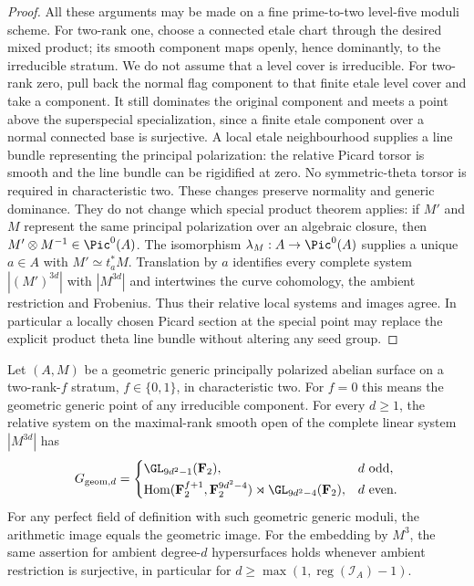 \begin{proof}
All these arguments may be made on a fine prime-to-two
level-five moduli scheme. For two-rank one, choose a
connected etale chart through the desired mixed product;
its smooth component maps openly, hence dominantly, to
the irreducible stratum. We do not assume that a level
cover is irreducible. For two-rank zero, pull back the
normal flag component to that finite etale level cover
and take a component. It still dominates the original
component and meets a point above the superspecial
specialization, since a finite etale component over a
normal connected base is surjective. A local etale
neighbourhood supplies a line bundle representing the
principal polarization: the relative Picard torsor is
smooth and the line bundle can be rigidified at zero.
No symmetric-theta torsor is required in characteristic two.
These changes preserve normality and generic dominance.
They do not change which special product theorem applies:
if $M'$ and $M$ represent the same principal polarization
over an algebraic closure, then $M'\otimes M^{-1}\in\Pic^0(A)$.
The isomorphism $\lambda_M:A\to\Pic^0(A)$ supplies a unique
$a\in A$ with $M'\simeq t_a^*M$. Translation by $a$
identifies every complete system $|(M')^{3d}|$ with
$|M^{3d}|$ and intertwines the curve cohomology, the ambient
restriction and Frobenius. Thus their relative local systems
and images agree. In particular a locally chosen Picard
section at the special point may replace the explicit
product theta line bundle without altering any seed group.
\end{proof}

\begin{theorem}
\label{thm:generic-nonordinary-ppav-groups-candidate}
Let $(A,M)$ be a geometric generic principally polarized
abelian surface on a two-rank-$f$ stratum, $f\in\{0,1\}$,
in characteristic two. For $f=0$ this means the geometric
generic point of any irreducible component.
For every $d\ge1$, the relative system on the maximal-rank
smooth open of the complete linear system $|M^{3d}|$ has
\[
 G_{\mathrm{geom},d}=
 \begin{cases}
 \GL_{9d^2-1}(\mathbf F_2),&d\text{ odd},\\[2pt]
 \operatorname{Hom}(\mathbf F_2^{f+1},\mathbf F_2^{9d^2-4})
       \rtimes\GL_{9d^2-4}(\mathbf F_2),&d\text{ even}.
 \end{cases}
\]
For any perfect field of definition with such geometric
generic moduli, the arithmetic image equals the geometric
image. For the embedding by $M^3$, the same assertion for
ambient degree-$d$ hypersurfaces holds whenever ambient
restriction is surjective, in particular for
$d\ge\max(1,\operatorname{reg}(\mathcal I_A)-1)$.
\end{theorem}

